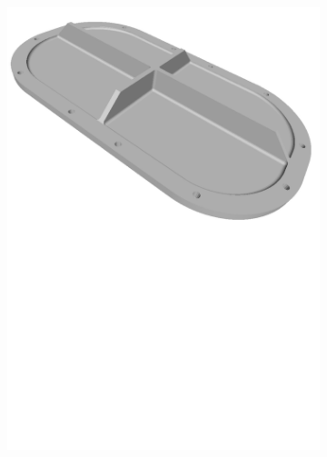 \begin{figure}[h!]
{\begin{tcolorbox}
\begin{subfigure}[c]{.23\textwidth}
          \caption{}
          \label{fig:bracket}
      \end{subfigure}
      \hfill
      \begin{subfigure}[c]{.23\textwidth}
          \centering
          \includegraphics[trim={0cm 12cm 0cm 0cm},clip,width=1\linewidth,angle=0]{Cap5/Figuras/objects/cover_plate.pdf}
          \caption{}
          \label{fig:cover_plate}
      \end{subfigure}
      \hfill
      \begin{subfigure}[c]{.23\textwidth}
          \centering

\end{subfigure}
\end{tcolorbox}}
\end{figure}
